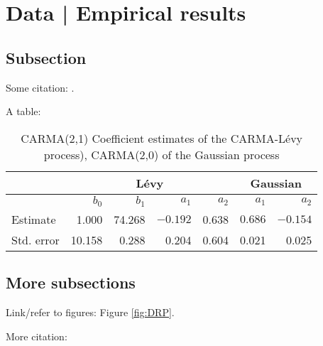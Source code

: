 \newpage\section{Data | Empirical results}\label{sec:results}

\subsection{Subsection}

Some citation: \citet{Bowman:1997}.

A table:
\begin{table}[H]
	\begin{center}
		\begin{tabular}{l|rrrr||rr}\hline\hline
			&\multicolumn{4}{c}{L\'evy}&\multicolumn{2}{c}{Gaussian} \\
			\hline
			& $b_0$ & $b_1$ & $a_1$ & $a_2$ & $a_1$ & $a_2$\\
			\hline
			Estimate & 1.000 & 74.268 & $-0.192$ &  0.638& $0.686$ &  $-0.154$\\
			Std. error & 10.158 & 0.288 & 0.204 & 0.604 & 0.021 &  0.025\\
			\hline\hline
		\end{tabular}
		\caption{CARMA(2,1) Coefficient estimates of the CARMA-L\'{e}vy process), CARMA(2,0) of the Gaussian process} %
	\end{center}
\end{table}



\subsection{More subsections}
Link/refer to figures: Figure \ref{fig:DRP}.

More citation: \cite{Weron:2008}